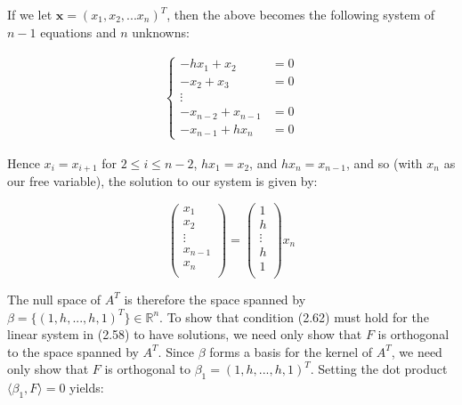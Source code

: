 \begin{solution}
    \pagebreak
    If we let $\textbf{x} = (x_1, x_2, ... x_n)^T$, then the above becomes the following system of $n-1$ equations and 
    $n$ unknowns:

    \begin{align*}
        \begin{cases}
                  -h x_1 + x_2 &= 0 \\
                    -x_2 + x_3 &= 0 \\
                             \vdots \\
            -x_{n-2} + x_{n-1} &= 0 \\
            -x_{n-1} + h x_{n} &= 0
        \end{cases}
    \end{align*}

    Hence $x_i = x_{i+1}$ for $2 \le i \le n-2$, $h x_1 = x_2$, and $h x_n = x_{n-1}$, and so (with $x_n$ as our free 
    variable), the solution to our system is given by:

    \[
    \begin{pmatrix} 
            x_1 \\
            x_2 \\
         \vdots \\
        x_{n-1} \\
            x_n \\
    \end{pmatrix} = 
    \begin{pmatrix} 
             1 \\
             h \\
        \vdots \\
             h \\
             1 \\
    \end{pmatrix} x_n
    \]

    The null space of $A^T$ is therefore the space spanned by $\beta = \{(1, h, ..., h, 1)^T\} \in \mathbb{R}^n$. To show that 
    condition (2.62) must hold for the linear system in (2.58) to have solutions, we need only show that $F$ is 
    orthogonal to the space spanned by $A^T$. Since $\beta$ forms a basis for the kernel of $A^T$, we need
    only show that $F$ is orthogonal to $\beta_1 = (1, h, ..., h, 1)^T$. Setting the dot product 
    $\langle \beta_1, F \rangle = 0$ yields:


\end{solution}
